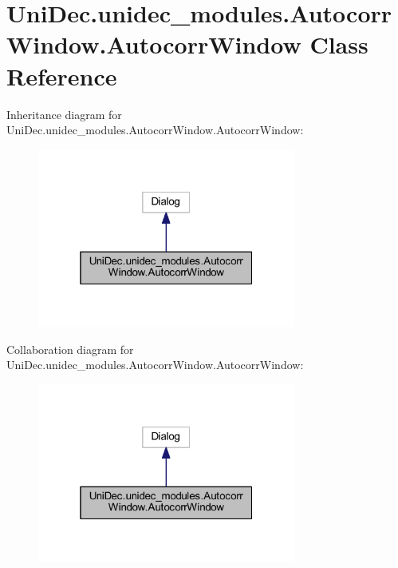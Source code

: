 \hypertarget{class_uni_dec_1_1unidec__modules_1_1_autocorr_window_1_1_autocorr_window}{}\section{Uni\+Dec.\+unidec\+\_\+modules.\+Autocorr\+Window.\+Autocorr\+Window Class Reference}
\label{class_uni_dec_1_1unidec__modules_1_1_autocorr_window_1_1_autocorr_window}


Inheritance diagram for Uni\+Dec.\+unidec\+\_\+modules.\+Autocorr\+Window.\+Autocorr\+Window\+:\nopagebreak
\begin{figure}[H]
\begin{center}
\leavevmode
\includegraphics[width=241pt]{class_uni_dec_1_1unidec__modules_1_1_autocorr_window_1_1_autocorr_window__inherit__graph}
\end{center}
\end{figure}


Collaboration diagram for Uni\+Dec.\+unidec\+\_\+modules.\+Autocorr\+Window.\+Autocorr\+Window\+:\nopagebreak
\begin{figure}[H]
\begin{center}
\leavevmode
\includegraphics[width=241pt]{class_uni_dec_1_1unidec__modules_1_1_autocorr_window_1_1_autocorr_window__coll__graph}
\end{center}
\end{figure}
